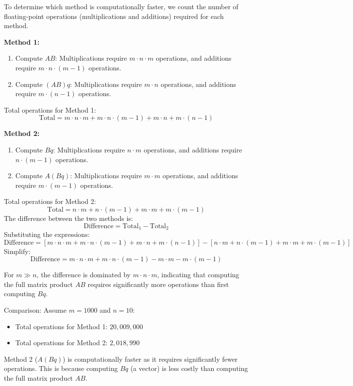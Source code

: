 \documentclass[12pt]{article}
\begin{document}
\begin{enumerate}
To determine which method is computationally faster, we count the number of floating-point operations (multiplications and additions) required for each method.

\textbf{Method 1:} 
\begin{enumerate}
    \item Compute \( AB \): Multiplications require \( m \cdot n \cdot m \) operations, and additions require \( m \cdot n \cdot (m - 1) \) operations.
    \item Compute \( (AB)q \): Multiplications require \( m \cdot n \) operations, and additions require \( m \cdot (n - 1) \) operations.
\end{enumerate}
Total operations for Method 1:
\[
\text{Total} = m \cdot n \cdot m + m \cdot n \cdot (m - 1) + m \cdot n + m \cdot (n - 1)
\]

\textbf{Method 2:}
\begin{enumerate}
    \item Compute \( Bq \): Multiplications require \( n \cdot m \) operations, and additions require \( n \cdot (m - 1) \) operations.
    \item Compute \( A(Bq) \): Multiplications require \( m \cdot m \) operations, and additions require \( m \cdot (m - 1) \) operations.
\end{enumerate}
Total operations for Method 2:
\[
\text{Total} = n \cdot m + n \cdot (m - 1) + m \cdot m + m \cdot (m - 1)
\]
The difference between the two methods is:
\[
\text{Difference} = \text{Total}_1 - \text{Total}_2
\]
Substituting the expressions:
\[
\text{Difference} = [m \cdot n \cdot m + m \cdot n \cdot (m - 1) + m \cdot n + m \cdot (n - 1)]
- [n \cdot m + n \cdot (m - 1) + m \cdot m + m \cdot (m - 1)]
\]
Simplify:
\[
\text{Difference} = m \cdot n \cdot m + m \cdot n \cdot (m - 1) - m \cdot m - m \cdot (m - 1)
\]

For \( m \gg n \), the difference is dominated by \( m \cdot n \cdot m \), indicating that computing the full matrix product \( AB \) requires significantly more operations than first computing \( Bq \).

Comparison: Assume \( m = 1000 \) and \( n = 10 \):
\begin{itemize}
    \item Total operations for Method 1: \( 20,009,000 \)
    \item Total operations for Method 2: \( 2,018,990 \)
\end{itemize}

Method 2 (\( A(Bq) \)) is computationally faster as it requires significantly fewer operations. This is because computing \( Bq \) (a vector) is less costly than computing the full matrix product \( AB \).


\end{enumerate}
\end{document}
